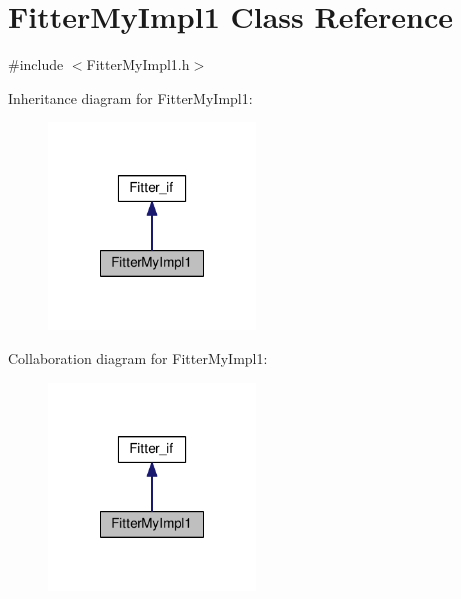 \hypertarget{class_fitter_my_impl1}{\section{Fitter\-My\-Impl1 Class Reference}
\label{class_fitter_my_impl1}
}


{\ttfamily \#include $<$Fitter\-My\-Impl1.\-h$>$}



Inheritance diagram for Fitter\-My\-Impl1\-:\nopagebreak
\begin{figure}[H]
\begin{center}
\leavevmode
\includegraphics[width=156pt]{class_fitter_my_impl1__inherit__graph}
\end{center}
\end{figure}


Collaboration diagram for Fitter\-My\-Impl1\-:\nopagebreak
\begin{figure}[H]
\begin{center}
\leavevmode
\includegraphics[width=156pt]{class_fitter_my_impl1__coll__graph}
\end{center}
\end{figure}
